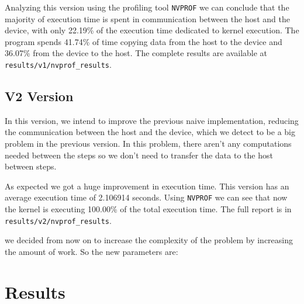 \documentclass[conference]{IEEEtran}
\begin{document}
Analyzing this version using the profiling tool \texttt{NVPROF} we can conclude that the majority of execution time is spent in communication between the host and the device, with only  22.19\% of the execution time dedicated to kernel execution. The program spends 41.74\% of time copying data from the host to the device and 36.07\% from the device to the host. The complete results are available at \texttt{results/v1/nvprof\_results}.

\subsection{V2 Version}
In this version, we intend to improve the previous naive implementation, reducing the communication between the host and the device, which we detect to be a big problem in the previous version. In this problem, there aren't any computations needed between the steps so we don't need to transfer the data to the host between steps.

As expected we got a huge improvement in execution time. This version has an average execution time of 2.106914 seconds. Using \texttt{NVPROF} we can see that now the kernel is executing 100.00\% of the total execution time. The full report is in \texttt{results/v2/nvprof\_results}.

we decided from now on to increase the complexity of the problem by increasing the amount of work. So the new parameters are:




\section{Results}
\end{document}
